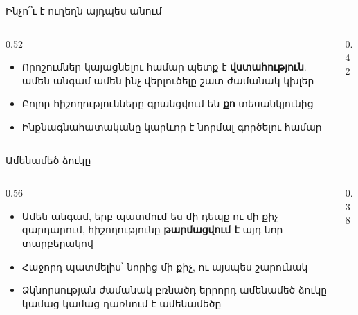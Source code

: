 \begin{frame}{Ինչո՞ւ է ուղեղն այդպես անում}
  \begin{columns}[c]
    \begin{column}{0.52\textwidth}
      \begin{itemize}
        \item Որոշումներ կայացնելու համար պետք է \textbf{վստահություն}. ամեն անգամ ամեն ինչ վերլուծելը շատ ժամանակ կխլեր
        \item Բոլոր հիշողությունները գրանցվում են \textbf{քո} տեսանկյունից
        \item Ինքնագնահատականը կարևոր է նորմալ գործելու համար
      \end{itemize}
    \end{column}
    \begin{column}{0.42\textwidth}
    \end{column}
  \end{columns}
\end{frame}

\begin{frame}{Ամենամեծ ձուկը}
  \begin{columns}[c]
    \begin{column}{0.56\textwidth}
      \begin{itemize}
        \item Ամեն անգամ, երբ պատմում ես մի դեպք ու մի քիչ զարդարում, հիշողությունը \textbf{թարմացվում է} այդ նոր տարբերակով
        \item<2-> Հաջորդ պատմելիս՝ նորից մի քիչ, ու այսպես շարունակ
        \item<3-> Ձկնորսության ժամանակ բռնածդ երրորդ ամենամեծ ձուկը կամաց-կամաց դառնում է ամենամեծը 
      \end{itemize}
    \end{column}
    \begin{column}{0.38\textwidth}
    \end{column}
  \end{columns}
\end{frame}

